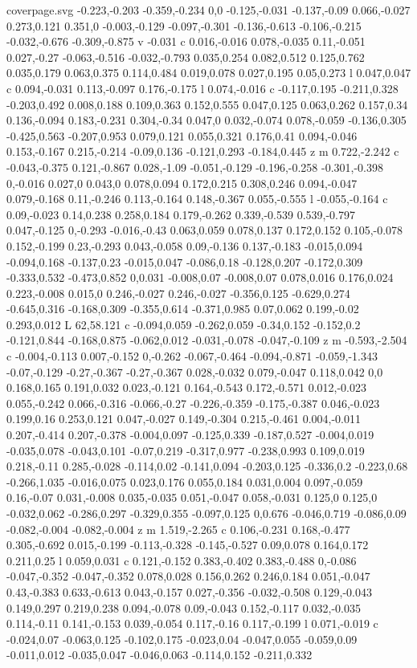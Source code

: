 \begin{filecontents}[noheader]{coverpage.svg}
-0.223,-0.203 -0.359,-0.234 0,0 -0.125,-0.031 -0.137,-0.09 0.066,-0.027 0.273,0.121 0.351,0 -0.003,-0.129 -0.097,-0.301 -0.136,-0.613 -0.106,-0.215 -0.032,-0.676 -0.309,-0.875 v -0.031 c 0.016,-0.016 0.078,-0.035 0.11,-0.051 0.027,-0.27 -0.063,-0.516 -0.032,-0.793 0.035,0.254 0.082,0.512 0.125,0.762 0.035,0.179 0.063,0.375 0.114,0.484 0.019,0.078 0.027,0.195 0.05,0.273 l 0.047,0.047 c 0.094,-0.031 0.113,-0.097 0.176,-0.175 l 0.074,-0.016 c -0.117,0.195 -0.211,0.328 -0.203,0.492 0.008,0.188 0.109,0.363 0.152,0.555 0.047,0.125 0.063,0.262 0.157,0.34 0.136,-0.094 0.183,-0.231 0.304,-0.34 0.047,0 0.032,-0.074 0.078,-0.059 -0.136,0.305 -0.425,0.563 -0.207,0.953 0.079,0.121 0.055,0.321 0.176,0.41 0.094,-0.046 0.153,-0.167 0.215,-0.214 -0.09,0.136 -0.121,0.293 -0.184,0.445 z m 0.722,-2.242 c -0.043,-0.375 0.121,-0.867 0.028,-1.09 -0.051,-0.129 -0.196,-0.258 -0.301,-0.398 0,-0.016 0.027,0 0.043,0 0.078,0.094 0.172,0.215 0.308,0.246 0.094,-0.047 0.079,-0.168 0.11,-0.246 0.113,-0.164 0.148,-0.367 0.055,-0.555 l -0.055,-0.164 c 0.09,-0.023 0.14,0.238 0.258,0.184 0.179,-0.262 0.339,-0.539 0.539,-0.797 0.047,-0.125 0,-0.293 -0.016,-0.43 0.063,0.059 0.078,0.137 0.172,0.152 0.105,-0.078 0.152,-0.199 0.23,-0.293 0.043,-0.058 0.09,-0.136 0.137,-0.183 -0.015,0.094 -0.094,0.168 -0.137,0.23 -0.015,0.047 -0.086,0.18 -0.128,0.207 -0.172,0.309 -0.333,0.532 -0.473,0.852 0,0.031 -0.008,0.07 -0.008,0.07 0.078,0.016 0.176,0.024 0.223,-0.008 0.015,0 0.246,-0.027 0.246,-0.027 -0.356,0.125 -0.629,0.274 -0.645,0.316 -0.168,0.309 -0.355,0.614 -0.371,0.985 0.07,0.062 0.199,-0.02 0.293,0.012 L 62,58.121 c -0.094,0.059 -0.262,0.059 -0.34,0.152 -0.152,0.2 -0.121,0.844 -0.168,0.875 -0.062,0.012 -0.031,-0.078 -0.047,-0.109 z m -0.593,-2.504 c -0.004,-0.113 0.007,-0.152 0,-0.262 -0.067,-0.464 -0.094,-0.871 -0.059,-1.343 -0.07,-0.129 -0.27,-0.367 -0.27,-0.367 0.028,-0.032 0.079,-0.047 0.118,0.042 0,0 0.168,0.165 0.191,0.032 0.023,-0.121 0.164,-0.543 0.172,-0.571 0.012,-0.023 0.055,-0.242 0.066,-0.316 -0.066,-0.27 -0.226,-0.359 -0.175,-0.387 0.046,-0.023 0.199,0.16 0.253,0.121 0.047,-0.027 0.149,-0.304 0.215,-0.461 0.004,-0.011 0.207,-0.414 0.207,-0.378 -0.004,0.097 -0.125,0.339 -0.187,0.527 -0.004,0.019 -0.035,0.078 -0.043,0.101 -0.07,0.219 -0.317,0.977 -0.238,0.993 0.109,0.019 0.218,-0.11 0.285,-0.028 -0.114,0.02 -0.141,0.094 -0.203,0.125 -0.336,0.2 -0.223,0.68 -0.266,1.035 -0.016,0.075 0.023,0.176 0.055,0.184 0.031,0.004 0.097,-0.059 0.16,-0.07 0.031,-0.008 0.035,-0.035 0.051,-0.047 0.058,-0.031 0.125,0 0.125,0 -0.032,0.062 -0.286,0.297 -0.329,0.355 -0.097,0.125 0,0.676 -0.046,0.719 -0.086,0.09 -0.082,-0.004 -0.082,-0.004 z m 1.519,-2.265 c 0.106,-0.231 0.168,-0.477 0.305,-0.692 0.015,-0.199 -0.113,-0.328 -0.145,-0.527 0.09,0.078 0.164,0.172 0.211,0.25 l 0.059,0.031 c 0.121,-0.152 0.383,-0.402 0.383,-0.488 0,-0.086 -0.047,-0.352 -0.047,-0.352 0.078,0.028 0.156,0.262 0.246,0.184 0.051,-0.047 0.43,-0.383 0.633,-0.613 0.043,-0.157 0.027,-0.356 -0.032,-0.508 0.129,-0.043 0.149,0.297 0.219,0.238 0.094,-0.078 0.09,-0.043 0.152,-0.117 0.032,-0.035 0.114,-0.11 0.141,-0.153 0.039,-0.054 0.117,-0.16 0.117,-0.199 l 0.071,-0.019 c -0.024,0.07 -0.063,0.125 -0.102,0.175 -0.023,0.04 -0.047,0.055 -0.059,0.09 -0.011,0.012 -0.035,0.047 -0.046,0.063 -0.114,0.152 -0.211,0.332 
\end{filecontents}
